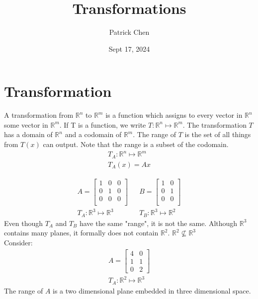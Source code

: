 \documentclass{article}
\title{Transformations}
\author{Patrick Chen}
\date{Sept 17, 2024}
\theoremstyle{mytheoremstyle}
\theoremstyle{mytheoremstyle}
\theoremstyle{myproblemstyle}
\begin{document}
    \maketitle
    \section*{Transformation}
    A transformation from $\mathbb{R}^n$ to $\mathbb{R}^m$ is a function which
    assigns to every vector in $\mathbb{R}^n$ some vector in $\mathbb{R}^m$. If
    T is a function, we write $T: \mathbb{R}^n \mapsto \mathbb{R}^m$. The
    transformation $T$ has a domain of $\mathbb{R}^n$ and a codomain of
    $\mathbb{R}^m$. The range of $T$ is the set of all things from $T(x)$ can
    output. Note that the range is a subset of the codomain.
    \begin{align*}
        T_A: \mathbb{R}^n \mapsto \mathbb{R}^m \\
        T_A(x) = Ax
    \end{align*}

    \begin{align*}
        A = \begin{bmatrix}
            1 & 0 & 0 \\
            0 & 1 & 0 \\
            0 & 0 & 0 \\
        \end{bmatrix} &&
        B = \begin{bmatrix}
            1 & 0 \\
            0 & 1 \\
            0 & 0 \\
        \end{bmatrix} \\
        T_A: \mathbb{R}^3 \mapsto \mathbb{R}^3 &&
        T_B: \mathbb{R}^3 \mapsto \mathbb{R}^2
    \end{align*}
    Even though $T_A$ and $T_B$ have the same "range", it is not the same.
    Although $\mathbb{R}^3$ contains many planes, it formally does not contain
    $\mathbb{R}^2$. $\mathbb{R}^2 \nsubseteq \mathbb{R}^3$ \\
    Consider:
    \begin{align*}
        A = \begin{bmatrix}
            4 & 0 \\
            1 & 1 \\
            0 & 2
        \end{bmatrix} \\
        T_A: \mathbb{R}^2 \mapsto \mathbb{R}^3
    \end{align*}
    The range of $A$ is a two dimensional plane embedded in three dimensional
    space.
\end{document}
